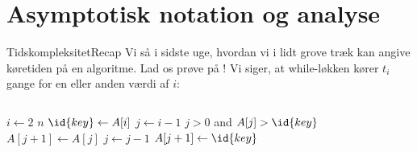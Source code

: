 \documentclass{beamer}
\begin{document}
\section{Asymptotisk notation og analyse}

\begin{frame}{Tidskompleksitet}{Recap}
    Vi så i sidste uge, hvordan vi i lidt grove træk kan angive køretiden på en
    algoritme. Lad os prøve på ! Vi siger, at while-løkken
    kører $t_i$ gange for en eller anden værdi af $i$:

    \begin{columns}
        \begin{codebox}
            \li \For $i \gets 2$ \To $n$ \Do
                \li $\id{key} \gets A[i]$
                \li $j \gets i - 1$
                \li \While $j > 0$ and $A[j] > \id{key}$ \Do
                    \li $A[j+1] \gets A[j]$
                    \li $j \gets j - 1$
                \End
                \li $A[j+1] \gets \id{key}$
            \End
        \end{codebox}
        
        \begin{codebox}
            \zi {}
            \zi {}
            \zi {}
            \zi {}
            \zi {}
            \zi {}
            \zi {}
        \end{codebox}
    \end{columns}

    \medskip

\end{frame}
\end{document}

